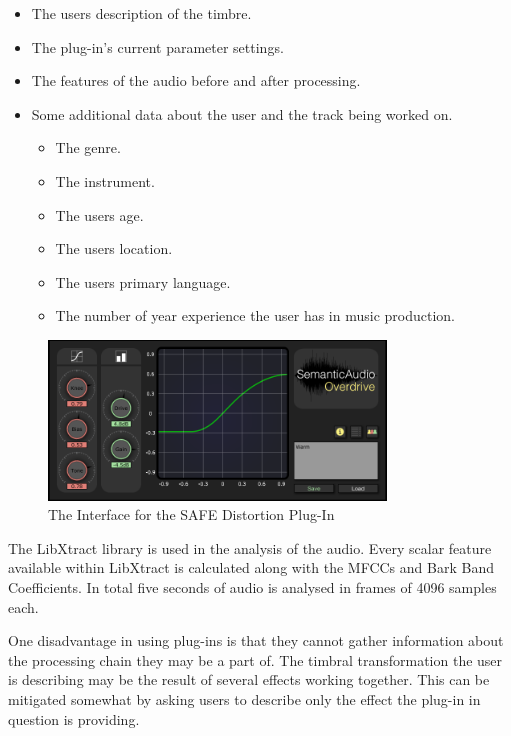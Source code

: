 		\begin{itemize}
			\item The users description of the timbre.
			\item The plug-in's current parameter settings.
			\item The features of the audio before and after processing.
			\item Some additional data about the user and the track being worked on.
			\begin{itemize}
				\item The genre.
				\item The instrument.
				\item The users age.
				\item The users location.
				\item The users primary language.
				\item The number of year experience the user has in music production.
			\end{itemize}
		\end{itemize}

		\begin{figure}[h!]
			\centering
			\includegraphics[width=0.8\textwidth]{chapter4/Images/SAFEDistortion.png}
			\caption{The Interface for the SAFE Distortion Plug-In}
			\label{fig:SAFE-Distortion}
		\end{figure}

		The LibXtract library \citep{bullock2007libxtract} is used in the analysis of the audio. Every scalar
		feature available within LibXtract is calculated along with the MFCCs and Bark Band Coefficients. In total
		five seconds of audio is analysed in frames of 4096 samples each.



		One disadvantage in using plug-ins is that they cannot gather information about the processing chain they
		may be a part of. The timbral transformation the user is describing may be the result of several effects
		working together. This can be mitigated somewhat by asking users to describe only the effect the plug-in in
		question is providing.

